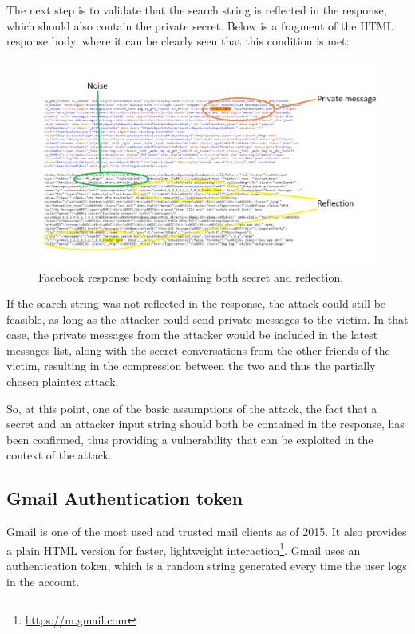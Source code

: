 The next step is to validate that the search string is reflected in the
response, which should also contain the private secret. Below is a fragment of
the HTML response body, where it can be clearly seen that this condition is met:

\begin{figure}[H] \caption{Facebook response body containing both secret and
reflection.} \centering
\includegraphics[width=1.1\textwidth]{diagrams/fb_response.png}\end{figure}

If the search string was not reflected in the response, the attack could still
be feasible, as long as the attacker could send private messages to the victim.
In that case, the private messages from the attacker would be included in the
latest messages list, along with the secret conversations from the other friends
of the victim, resulting in the compression between the two and thus the
partially chosen plaintex attack.

So, at this point, one of the basic assumptions of the attack, the fact that a
secret and an attacker input string should both be contained in the response,
has been confirmed, thus providing a vulnerability that can be exploited in the
context of the attack.

\subsection{Gmail Authentication token}

Gmail is one of the most used and trusted mail clients as of 2015. It also
provides a plain HTML version for faster, lightweight
interaction\footnote{\url{https://m.gmail.com}}. Gmail uses an authentication
token, which is a random string generated every time the user logs in the
account.

